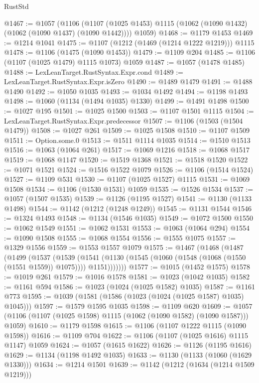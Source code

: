 \begin{lexlean}{RustStd}
\begin{coremodule}
@1467 := @1057
    (@1106
      (@1107 (@1025 @1453) @1115 (@1062 (@1090 @1432) (@1062 (@1090 @1437) (@1090 @1442))))
      @1059)
@1468 := @1179 @1453
@1469 := @1214 @1041
@1475 := @1107 (@1212 (@1469 (@1214 @1222 @1219))) @1115
@1478 := @1106 (@1475 (@1090 @1453))
@1479 := @1109 @204
@1485 := @1106 (@1107 (@1025 @1479) @1115 @1073) @1059
@1487 := @1057 (@1478 @1485)
@1488 := LexLeanTarget.RustSyntax.Expr.cond
@1489 := LexLeanTarget.RustSyntax.Expr.isZero
@1490 := @1489 @1479
@1491 := @1488 @1490
@1492 := @1050 @1035
@1493 := @1034 @1492
@1494 := @1198 @1493
@1498 := @1060 (@1134 (@1494 @1035) @1330)
@1499 := @1491 @1498
@1500 := @1027 @195
@1501 := @1025 @1500
@1503 := @1107 @1501 @1115
@1504 := LexLeanTarget.RustSyntax.Expr.predecessor
@1507 := @1106 (@1503 (@1504 @1479))
@1508 := @1027 @261
@1509 := @1025 @1508
@1510 := @1107 @1509
@1511 := Option.some.{0}
@1513 := @1511 @1114 @1035
@1514 := @1510 @1513
@1516 := @1063 (@1064 @261)
@1517 := @1069 @1216
@1518 := @1068 @1517
@1519 := @1068 @1147
@1520 := @1519 @1368
@1521 := @1518 @1520
@1522 := @1071 @1521
@1524 := @1516 @1522 @1079
@1526 := @1106 (@1514 @1524)
@1527 := @1109 @531
@1530 := @1107 (@1025 @1527) @1115
@1531 := @1069 @1508
@1534 := @1106 (@1530 @1531) @1059
@1535 := @1526 @1534
@1537 := @1057 (@1507 @1535)
@1539 := @1126 (@1195 @1527)
@1541 := @1130 (@1133 @1498)
@1544 := @1142 (@1212 (@1248 @1249))
@1545 := @1131 @1544
@1546 := @1324 @1493
@1548 := @1134 (@1546 @1035)
@1549 := @1072 @1500
@1550 := @1062 @1549
@1551 := @1062 @1531
@1553 := @1063 (@1064 @294)
@1554 := @1090 @1508
@1555 := @1068 @1554
@1556 := @1555 @1075
@1557 := @1329 @1556
@1559 := @1553 @1557 @1079
@1575 := @1467
    (@1468
      (@1487
        (@1499
          (@1537
            (@1539
              (@1541 (@1130 (@1545 (@1060 (@1548 (@1068 (@1550 (@1551 @1559)) @1075)))) @1151)))))))
@1577 := @1015 (@1452 @1575)
@1578 := @1019 @261
@1579 := @1016 @1578
@1581 := @1023 (@1042 @1035)
@1582 := @1161 @594
@1586 := @1023 (@1024 (@1025 @1582) @1035)
@1587 := @1161 @773
@1595 := @1039 (@1581 (@1586 (@1023 (@1024 (@1025 @1587) @1035) @1045)))
@1597 := @1579 @1595 @1035
@1598 := @1109 @620
@1609 := @1057 (@1106 (@1107 (@1025 @1598) @1115 (@1062 (@1090 @1582) (@1090 @1587))) @1059)
@1610 := @1179 @1598
@1615 := @1106 (@1107 @1222 @1115 (@1090 @1598))
@1616 := @1109 @704
@1622 := @1106 (@1107 (@1025 @1616) @1115 @1147) @1059
@1624 := @1057 (@1615 @1622)
@1626 := @1126 (@1195 @1616)
@1629 := @1134 (@1198 @1492 @1035)
@1633 := @1130 (@1133 (@1060 (@1629 @1330)))
@1634 := @1214 @1501
@1639 := @1142 (@1212 (@1634 (@1214 @1509 @1219)))

\end{coremodule}
\end{lexlean}
